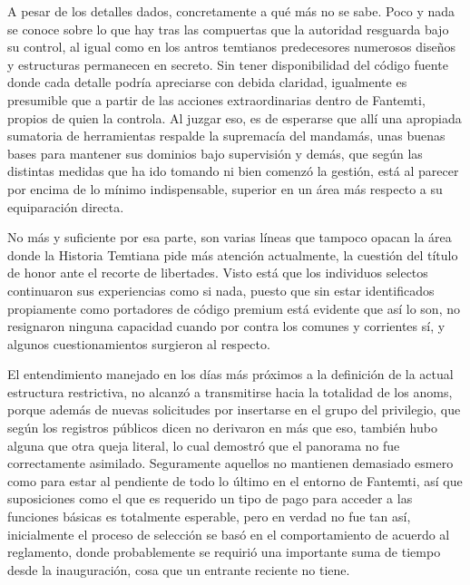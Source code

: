 \documentclass[
]{book}
\begin{document}
A pesar de los detalles dados, concretamente a qué más no se sabe. Poco y nada se conoce sobre lo que hay tras las compuertas que la autoridad resguarda bajo su control, al igual como en los antros temtianos predecesores numerosos diseños y estructuras permanecen en secreto. Sin tener disponibilidad del código fuente donde cada detalle podría apreciarse con debida claridad, igualmente es presumible que a partir de las acciones extraordinarias dentro de Fantemti, propios de quien la controla. Al juzgar eso, es de esperarse que allí una apropiada sumatoria de herramientas respalde la supremacía del mandamás, unas buenas bases para mantener sus dominios bajo supervisión y demás, que según las distintas medidas que ha ido tomando ni bien comenzó la gestión, está al parecer por encima de lo mínimo indispensable, superior en un área más respecto a su equiparación directa.

No más y suficiente por esa parte, son varias líneas que tampoco opacan la área donde la Historia Temtiana pide más atención actualmente, la cuestión del título de honor ante el recorte de libertades. Visto está que los individuos selectos continuaron sus experiencias como si nada, puesto que sin estar identificados propiamente como portadores de código premium está evidente que así lo son, no resignaron ninguna capacidad cuando por contra los comunes y corrientes sí, y algunos cuestionamientos surgieron al respecto.

El entendimiento manejado en los días más próximos a la definición de la actual estructura restrictiva, no alcanzó a transmitirse hacia la totalidad de los anoms, porque además de nuevas solicitudes por insertarse en el grupo del privilegio, que según los registros públicos dicen no derivaron en más que eso, también hubo alguna que otra queja literal, lo cual demostró que el panorama no fue correctamente asimilado. Seguramente aquellos no mantienen demasiado esmero como para estar al pendiente de todo lo último en el entorno de Fantemti, así que suposiciones como el que es requerido un tipo de pago para acceder a las funciones básicas es totalmente esperable, pero en verdad no fue tan así, inicialmente el proceso de selección se basó en el comportamiento de acuerdo al reglamento, donde probablemente se requirió una importante suma de tiempo desde la inauguración, cosa que un entrante reciente no tiene.
\end{document}
